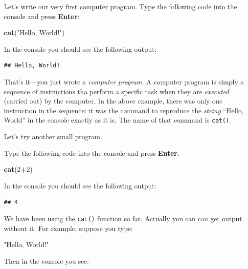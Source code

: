 \documentclass[]{book}
\makeatletter
\newenvironment{Shaded}{\begin{snugshade}}{\end{snugshade}}
\newcommand{\KeywordTok}[1]{\textcolor[rgb]{0.13,0.29,0.53}{\textbf{#1}}}
\newcommand{\DecValTok}[1]{\textcolor[rgb]{0.00,0.00,0.81}{#1}}
\newcommand{\StringTok}[1]{\textcolor[rgb]{0.31,0.60,0.02}{#1}}
\newcommand{\OperatorTok}[1]{\textcolor[rgb]{0.81,0.36,0.00}{\textbf{#1}}}
\newcommand{\NormalTok}[1]{#1}
\newenvironment{kframe}{%
\medskip{}
\setlength{\fboxsep}{.8em}
 \def\at@end@of@kframe{}%
 \ifinner\ifhmode%
  \def\at@end@of@kframe{\end{minipage}}%
  \begin{minipage}{\columnwidth}%
 \fi\fi%
 \def\FrameCommand##1{\hskip\@totalleftmargin \hskip-\fboxsep
 \colorbox{shadecolor}{##1}\hskip-\fboxsep
     \hskip-\linewidth \hskip-\@totalleftmargin \hskip\columnwidth}%
 \MakeFramed {\advance\hsize-\width
   \@totalleftmargin\z@ \linewidth\hsize
   \@setminipage}}%
 {\par\unskip\endMakeFramed%
 \at@end@of@kframe}
\renewenvironment{Shaded}{\begin{kframe}}{\end{kframe}}
\theoremstyle{definition}
\theoremstyle{definition}
\theoremstyle{definition}
\theoremstyle{remark}
\makeatother
\begin{document}
Let's write our very first computer program. 
Type the following code into the console and press \textbf{Enter}:

\begin{Shaded}
\begin{Highlighting}[]
\KeywordTok{cat}\NormalTok{(}\StringTok{"Hello, World!"}\NormalTok{)}
\end{Highlighting}
\end{Shaded}

In the console you should see the following output:

\begin{verbatim}
## Hello, World!
\end{verbatim}

That's it---you just wrote a \emph{computer program}. A computer program
is simply a sequence of instructions tha perform a specific task when
they are \emph{executed} (carried out) by the computer. In the above
example, there was only one instruction in the sequence: it was the
command to reproduce the \emph{string}  ``Hello, World''
in the console exactly as it is. The name of that command is
\texttt{cat()}.

Let's try another small program.

Type the following code into the console and press \textbf{Enter}:

\begin{Shaded}
\begin{Highlighting}[]
\KeywordTok{cat}\NormalTok{(}\DecValTok{2}\OperatorTok{+}\DecValTok{2}\NormalTok{)}
\end{Highlighting}
\end{Shaded}

In the console you should see the following output:

\begin{verbatim}
## 4
\end{verbatim}

We have been using the \texttt{cat()}
function so far. Actually you
can can get output without it. For example, suppose you type:

\begin{Shaded}
\begin{Highlighting}[]
\StringTok{"Hello, World!"}
\end{Highlighting}
\end{Shaded}

Then in the console you see:
\end{document}
